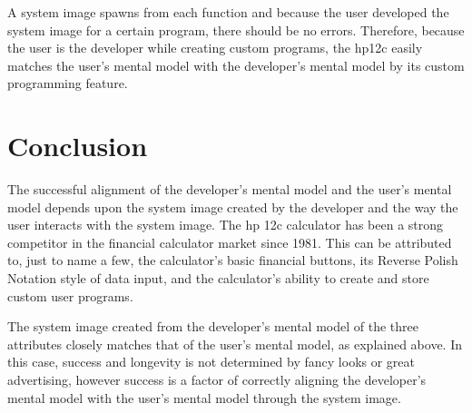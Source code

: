 \documentclass{article}
\begin{document}
A system image spawns from each function and because the user developed the system image for a certain program, there should be no errors. Therefore, because the user is the developer while creating custom programs, the hp12c easily matches the user's mental model with the developer's mental model by its custom programming feature.

\section{Conclusion}

The successful alignment of the developer's mental model and the user's mental model depends upon the system image created by the developer and the way the user interacts with the system image. The hp 12c calculator has been a strong competitor in the financial calculator market since 1981. This can be attributed to, just to name a few, the calculator's basic financial buttons, its Reverse Polish Notation style of data input, and the calculator's ability to create and store custom user programs.

 The system image created from the developer's mental model of the three attributes closely matches that of the user's mental model, as explained above. In this case, success and longevity is not determined by fancy looks or great advertising, however success is a factor of correctly aligning the developer's mental model with the user's mental model through the system image.



\end{document}
